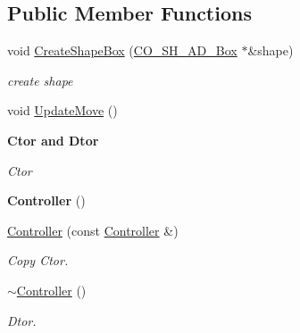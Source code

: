 \subsection*{Public Member Functions}
\begin{DoxyCompactItemize}
\item 
\hypertarget{classContent_1_1Actor_1_1Physics_1_1Controller_a5b5e1c0c15966a71727c23d3682202cc}{
void \hyperlink{classContent_1_1Actor_1_1Physics_1_1Controller_a5b5e1c0c15966a71727c23d3682202cc}{CreateShapeBox} (\hyperlink{classContent_1_1Shape_1_1Admin_1_1Box}{CO\_\-SH\_\-AD\_\-Box} $\ast$\&shape)}
\label{classContent_1_1Actor_1_1Physics_1_1Controller_a5b5e1c0c15966a71727c23d3682202cc}

\begin{DoxyCompactList}\small\item\em create shape \item\end{DoxyCompactList}\item 
void \hyperlink{classContent_1_1Actor_1_1Physics_1_1Controller_ab4cd228690c0077a92fb52466853c191}{UpdateMove} ()
\end{DoxyCompactItemize}
\begin{Indent}{\bf Ctor and Dtor}\par
{\em \label{_amgrpad04e46909a047f9938f8e1fa1abe24a}
 Ctor }\begin{DoxyCompactItemize}
\item 
\hypertarget{classContent_1_1Actor_1_1Physics_1_1Controller_a7e4b25b2b42a640a2e56703bf1ed8b61}{
{\bfseries Controller} ()}
\label{classContent_1_1Actor_1_1Physics_1_1Controller_a7e4b25b2b42a640a2e56703bf1ed8b61}

\item 
\hypertarget{classContent_1_1Actor_1_1Physics_1_1Controller_a9f3d6a9b27550a75c1959d1cb78d8ac2}{
\hyperlink{classContent_1_1Actor_1_1Physics_1_1Controller_a9f3d6a9b27550a75c1959d1cb78d8ac2}{Controller} (const \hyperlink{classContent_1_1Actor_1_1Physics_1_1Controller}{Controller} \&)}
\label{classContent_1_1Actor_1_1Physics_1_1Controller_a9f3d6a9b27550a75c1959d1cb78d8ac2}

\begin{DoxyCompactList}\small\item\em Copy Ctor. \item\end{DoxyCompactList}\item 
\hypertarget{classContent_1_1Actor_1_1Physics_1_1Controller_afea292cd343a790f951ce9e8ebda530c}{
\hyperlink{classContent_1_1Actor_1_1Physics_1_1Controller_afea292cd343a790f951ce9e8ebda530c}{$\sim$Controller} ()}
\label{classContent_1_1Actor_1_1Physics_1_1Controller_afea292cd343a790f951ce9e8ebda530c}

\begin{DoxyCompactList}\small\item\em Dtor. \item\end{DoxyCompactList}\end{DoxyCompactItemize}
\end{Indent}
